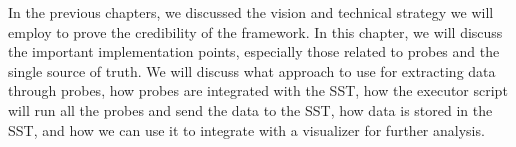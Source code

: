In the previous chapters, we discussed the vision and technical strategy we will employ to prove the credibility of the framework. In this chapter, we will discuss the important implementation points, especially those related to probes and the single source of truth. We will discuss what approach to use for extracting data through probes, how probes are integrated with the SST, how the executor script will run all the probes and send the data to the SST, how data is stored in the SST, and how we can use it to integrate with a visualizer for further analysis.